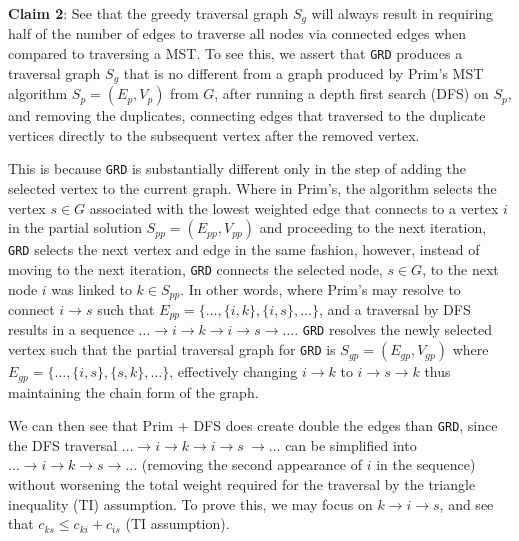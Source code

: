 \documentclass[11pt]{article}
\begin{document}
\medskip

\textbf{Claim 2}: See that the greedy traversal graph \(S_g\) will always result in requiring half of the number of edges to traverse all nodes via connected edges when compared to traversing a MST. To see this, we assert that \verb|GRD| produces a traversal graph \(S_g\) that is no different from a graph produced by Prim's MST algorithm \(S_p = (E_p, V_p)\) from \(G\), after running a depth first search (DFS) on \(S_p\), and removing the duplicates, connecting edges that traversed to the duplicate vertices directly to the subsequent vertex after the removed vertex.

\smallskip

This is because \verb|GRD| is substantially different only in the step of adding the selected vertex to the current graph. Where in Prim's, the algorithm selects the vertex \(s \in G\) associated with the lowest weighted edge that connects to a vertex \(i\) in the partial solution \(S_{pp} = (E_{pp}, V_{pp})\) and proceeding to the next iteration, \verb|GRD| selects the next vertex and edge in the same fashion, however, instead of moving to the next iteration, \verb|GRD| connects the selected node, \(s \in G\), to the next node \(i\) was linked to \(k \in S_{pp}\). In other words, where Prim's may resolve to connect \(i \rightarrow s\) such that \( E_{pp} = \{\ldots, \{i, k\}, \{i, s\}, \ldots\} \), and a traversal by DFS results in a sequence \(\ldots \rightarrow i \rightarrow k \rightarrow i \rightarrow s \rightarrow \ldots \). \verb|GRD| resolves the newly selected vertex such that the partial traversal graph for \verb|GRD| is \(S_{gp} = (E_{gp}, V_{gp}) \) where \( E_{gp} = \{\ldots, \{i, s\}, \{s, k\}, \ldots\} \), effectively changing \(i \rightarrow k\) to \(i \rightarrow s \rightarrow k \) thus maintaining the chain form of the graph. 

\smallskip

We can then see that Prim + DFS does create double the edges than \verb|GRD|, since the DFS traversal \(\ldots \rightarrow i \rightarrow k \rightarrow i \rightarrow s\ \rightarrow \ldots \) can be simplified into \( \ldots \rightarrow i \rightarrow k \rightarrow s \rightarrow \ldots \) (removing the second appearance of \(i\) in the sequence) without worsening the total weight required for the traversal by the triangle inequality (TI) assumption. To prove this, we may focus on \(k \rightarrow i \rightarrow s\), and see that \(c_{ks} \leq c_{ki} + c_{is}\) (TI assumption).

\smallskip
\end{document}
